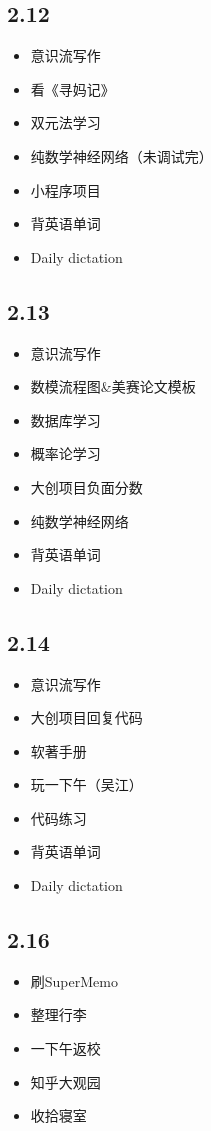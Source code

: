 \documentclass[UTF8]{ctexart}
\begin{document}
\subsection*{2.12}
\begin{itemize}
    \item 意识流写作
    \item 看《寻妈记》
    \item 双元法学习
    \item 纯数学神经网络（未调试完）
    \item 小程序项目
    \item 背英语单词
    \item Daily dictation
\end{itemize}
\subsection*{2.13}
\begin{itemize}
    \item 意识流写作
    \item 数模流程图\&美赛论文模板
    \item 数据库学习
    \item 概率论学习
    \item 大创项目负面分数
    \item 纯数学神经网络
    \item 背英语单词
    \item Daily dictation
\end{itemize}
\subsection*{2.14}
\begin{itemize}
    \item 意识流写作
    \item 大创项目回复代码
    \item 软著手册
    \item 玩一下午（吴江）
    \item 代码练习
    \item 背英语单词
    \item Daily dictation
\end{itemize}
\subsection*{2.16}
\begin{itemize}
    \item 刷SuperMemo
    \item 整理行李
    \item 一下午返校
    \item 知乎大观园
    \item 收拾寝室
\end{itemize}
\end{document}
